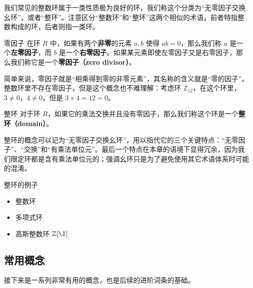 
\begin{issues}
\end{issues}





我们常见的整数环属于一类性质极为良好的环，我们称这个分类为“无零因子交换幺环”，或者“整环”。注意区分“整数环”和“整环”这两个相似的术语，前者特指整数构成的环，后者则指一类环。

\begin{definition}{零因子}\label{def_Domain_1}
在环 $R$ 中，如果有两个\textbf{非零}的元素 $a, b$ 使得 $ab=0$，那么我们称 $a$ 是一个\textbf{左零因子}，而 $b$ 是一个\textbf{右零因子}。如果某元素即使左零因子又是右零因子，那么我们称它是一个\textbf{零因子（zero divisor）}。
\end{definition}

简单来说，零因子就是“相乘得到零的非零元素”，其名称的含义就是“零的因子”。整数环里不存在零因子，但是这个概念也不难理解：考虑环 $\mathbb{Z}_{12}$，在这个环里，$3\not=0$，$4\not=0$，但是 $3\times 4=12=0$。

\begin{definition}{整环}
对于环 $R$，如果它的乘法交换并且没有零因子，那么我们称这个环是一个\textbf{整环（domain）}。
\end{definition}

整环的概念可以记为“无零因子交换幺环”，用以指代它的三个关键特点：“无零因子”、“交换”和“有乘法单位元”。最后一个特点在本章的语境下显得冗余，因为我们限定环都是含有乘法单位元的；强调幺环只是为了避免使用其它术语体系时可能的混淆。

\begin{example}{整环的例子}
\begin{itemize}
\item 整数环
\item 多项式环
\item 高斯整数环 $\mathbb{Z}[\I]$
\end{itemize}

\end{example}

\subsection{常用概念}

接下来是一系列非常有用的概念，也是后续的进阶词条的基础。

